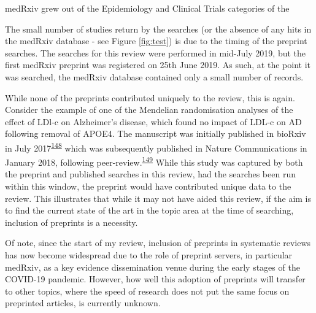 \documentclass[a4paper, twoside]{templates/ociamthesis}
\begin{document}
medRxiv grew out of the Epidemiology and Clinical Trials categories of the

The small number of studies return by the searches (or the absence of any hits in the medRxiv database - see Figure \ref{fig:test}) is due to the timing of the preprint searches. The searches for this review were performed in mid-July 2019, but the first medRxiv preprint was registered on 25th June 2019. As such, at the point it was searched, the medRxiv database contained only a small number of records.

While none of the preprints contributed uniquely to the review, this is again. Consider the example of one of the Mendelian randomisation analyses of the effect of LDl-c on Alzheimer's disease, which found no impact of LDL-c on AD following removal of APOE4. The manuscript was initially published in bioRxiv in July 2017\textsuperscript{\protect\hyperlink{ref-zhu2017}{148}} which was subsequently published in Nature Communications in January 2018, following peer-review.\textsuperscript{\protect\hyperlink{ref-zhu2018}{149}} While this study was captured by both the preprint and published searches in this review, had the searches been run within this window, the preprint would have contributed unique data to the review. This illustrates that while it may not have aided this review, if the aim is to find the current state of the art in the topic area at the time of searching, inclusion of preprints is a necessity.

Of note, since the start of my review, inclusion of preprints in systematic reviews has now become widespread due to the role of preprint servers, in particular medRxiv, as a key evidence dissemination venue during the early stages of the COVID-19 pandemic. However, how well this adoption of preprints will transfer to other topics, where the speed of research does not put the same focus on preprinted articles, is currently unknown.
\end{document}
